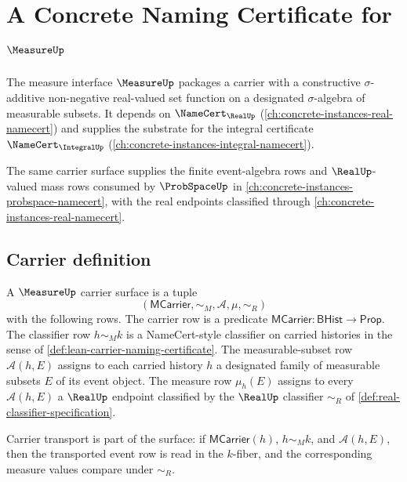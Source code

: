 \chapter{A Concrete Naming Certificate for $\MeasureUp$}
\label{ch:concrete-instances-measure-namecert}

The measure interface $\MeasureUp$ packages a carrier with a constructive $\sigma$-additive non-negative real-valued set function on a designated $\sigma$-algebra of measurable subsets. It depends on $\NameCert_{\RealUp}$ (\autoref{ch:concrete-instances-real-namecert}) and supplies the substrate for the integral certificate $\NameCert_{\IntegralUp}$ (\autoref{ch:concrete-instances-integral-namecert}).

The same carrier surface supplies the finite event-algebra rows and $\RealUp$-valued mass rows consumed by $\ProbSpaceUp$ in \autoref{ch:concrete-instances-probspace-namecert}, with the real endpoints classified through \autoref{ch:concrete-instances-real-namecert}.

\section{Carrier definition}
\label{sec:measure-carrier}

\begin{definition}
\label{def:measureup-carrier-surface}
\label{def:measure-carrier-specification}
A $\MeasureUp$ carrier surface is a tuple
$$
(\mathsf{MCarrier},\sim_M,\mathcal{A},\mu,\sim_R)
$$
with the following rows. The carrier row is a predicate
$\mathsf{MCarrier}:\mathsf{BHist}\to\mathsf{Prop}$. The classifier row
$h\sim_M k$ is a NameCert-style classifier on carried histories in the sense of
\autoref{def:lean-carrier-naming-certificate}. The measurable-subset row
$\mathcal{A}(h,E)$ assigns to each carried history $h$ a designated family of
measurable subsets $E$ of its event object. The measure row
$\mu_h(E)$ assigns to every $\mathcal{A}(h,E)$ a $\RealUp$ endpoint classified
by the $\RealUp$ classifier $\sim_R$ of
\autoref{def:real-classifier-specification}.

Carrier transport is part of the surface: if $\mathsf{MCarrier}(h)$,
$h\sim_M k$, and $\mathcal{A}(h,E)$, then the transported event row is read in
the $k$-fiber, and the corresponding measure values compare under $\sim_R$.
\end{definition}

